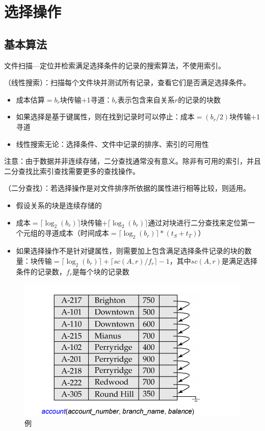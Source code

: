 \section{选择操作}

\subsection{基本算法}

文件扫描---定位并检索满足选择条件的记录的搜索算法，不使用索引。

（线性搜索）：扫描每个文件块并测试所有记录，查看它们是否满足选择条件。
\begin{itemize}
    \item 成本估算$=b_r$块传输+1寻道：$b_r$表示包含来自关系$r$的记录的块数
    \item 如果选择是基于键属性，则在找到记录时可以停止：成本$=(b_r/2)$块传输+1寻道
    \item 线性搜索无论：选择条件、文件中记录的排序、索引的可用性
\end{itemize}

注意：由于数据并非连续存储，二分查找通常没有意义。除非有可用的索引，并且二分查找比索引查找需要更多的查找操作。

（二分查找）：若选择操作是对文件排序所依据的属性进行相等比较，则适用。
\begin{itemize}
    \item 假设关系的块是连续存储的
    \item 成本$=\lceil \log_2(b_r) \rceil$块传输$+\lceil \log_2(b_r) \rceil$通过对块进行二分查找来定位第一个元组的寻道成本（时间成本$=\lceil \log_2(b_r) \rceil*(t_S+t_T)$）
    \item 如果选择操作不是针对键属性，则需要加上包含满足选择条件记录的块的数量：块传输$=\lceil \log_2(b_r) \rceil+\lceil sc(A,r)/f_r \rceil-1$，其中$sc(A,r)$是满足选择条件的记录数，$f_r$是每个块的记录数
\end{itemize}

\begin{figure}[H]
    \centering
    \includegraphics[width=0.8\linewidth]{image2.png}
    \caption{例}
    \label{}
\end{figure}

